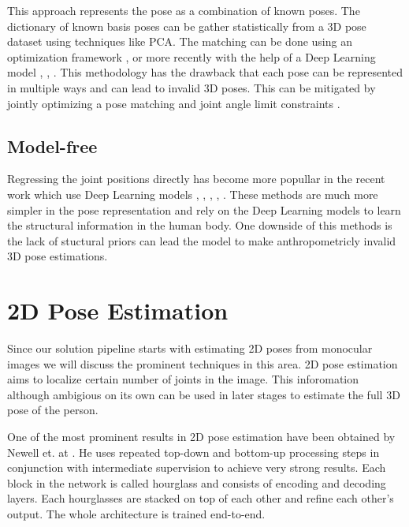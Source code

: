 This approach represents the pose as a combination of known poses. The dictionary of known basis poses can be gather statistically from a 3D pose dataset using techniques like PCA. The matching can be done using an optimization framework  \parencite{ramakrishna2012reconstructing}, \parencite{zhou20153d} or more recently with the help of a Deep Learning model \parencite{zhou2016sparseness}, \parencite{chen20173d}, \parencite{tome2017lifting}. This methodology has the drawback that each pose can be represented in multiple ways and can lead to invalid 3D poses. This can be mitigated by jointly optimizing a pose matching and joint angle limit constraints \parencite{akhter2015pose}.

\subsection{Model-free}

Regressing the joint positions directly has become more popullar in the recent work which use Deep Learning models , \parencite{pavlakos2017coarse}, \parencite{martinez2017simple}, \parencite{hossain2017exploiting}, \parencite{tekin2017learning}. These methods are much more simpler in the pose representation and rely on the Deep Learning models to learn the structural information in the human body. One downside of this methods is the lack of stuctural priors can lead the model to make anthropometricly invalid 3D pose estimations.

\section{2D Pose Estimation}

Since our solution pipeline starts with estimating 2D poses from monocular images we will discuss the prominent techniques in this area. 2D pose estimation aims to localize certain number of joints in the image. This inforomation although ambigious on its own can be used in later stages to estimate the full 3D pose of the person.

One of the most prominent results in 2D pose estimation have been obtained by Newell et. at \parencite{newell2016stacked}. He uses repeated top-down and bottom-up processing steps in conjunction with intermediate supervision to achieve very strong results. Each block in the network is called hourglass and consists of encoding and decoding layers. Each hourglasses are stacked on top of each other and refine each other's output. The whole architecture is trained end-to-end.


